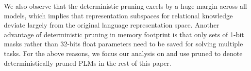 We also observe that the deterministic pruning excels by a huge margin 
across all models, which implies that representation subspaces for relational knowledge deviate largely from the original language representation space. Another advantage of deterministic pruning in memory 
footprint is that only sets of 1-bit masks rather than 32-bits float parameters 
need to be saved for solving multiple tasks. For the above reasons, 
we focus our analysis on and use \textsf{pruned} to denote deterministically 
pruned PLMs in the rest of this paper. 








